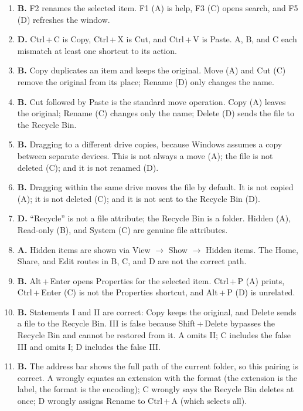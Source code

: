 \documentclass[11pt]{article}
\begin{document}
\begin{enumerate}[label=\textbf{Q\arabic*.}, leftmargin=*]
\item \textbf{B.} F2 renames the selected item. F1 (A) is help, F3 (C) opens
  search, and F5 (D) refreshes the window.
\item \textbf{D.} Ctrl\,+\,C is Copy, Ctrl\,+\,X is Cut, and Ctrl\,+\,V is
  Paste. A, B, and C each mismatch at least one shortcut to its action.
\item \textbf{B.} Copy duplicates an item and keeps the original. Move (A) and
  Cut (C) remove the original from its place; Rename (D) only changes the name.
\item \textbf{B.} Cut followed by Paste is the standard move operation. Copy
  (A) leaves the original; Rename (C) changes only the name; Delete (D) sends
  the file to the Recycle Bin.
\item \textbf{B.} Dragging to a different drive copies, because Windows
  assumes a copy between separate devices. This is not always a move (A); the
  file is not deleted (C); and it is not renamed (D).
\item \textbf{B.} Dragging within the same drive moves the file by default. It
  is not copied (A); it is not deleted (C); and it is not sent to the Recycle
  Bin (D).
\item \textbf{D.} ``Recycle'' is not a file attribute; the Recycle Bin is a
  folder. Hidden (A), Read-only (B), and System (C) are genuine file
  attributes.
\item \textbf{A.} Hidden items are shown via View $\rightarrow$ Show
  $\rightarrow$ Hidden items. The Home, Share, and Edit routes in B, C, and D
  are not the correct path.
\item \textbf{B.} Alt\,+\,Enter opens Properties for the selected item.
  Ctrl\,+\,P (A) prints, Ctrl\,+\,Enter (C) is not the Properties shortcut,
  and Alt\,+\,P (D) is unrelated.
\item \textbf{B.} Statements I and II are correct: Copy keeps the original,
  and Delete sends a file to the Recycle Bin. III is false because
  Shift\,+\,Delete bypasses the Recycle Bin and cannot be restored from it.
  A omits II; C includes the false III and omits I; D includes the false III.
\item \textbf{B.} The address bar shows the full path of the current folder,
  so this pairing is correct. A wrongly equates an extension with the format
  (the extension is the label, the format is the encoding); C wrongly says the
  Recycle Bin deletes at once; D wrongly assigns Rename to Ctrl\,+\,A (which
  selects all).


\end{enumerate}
\end{document}
